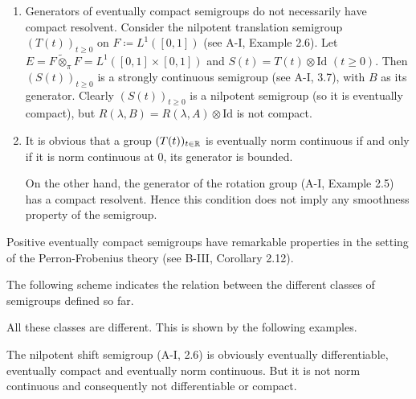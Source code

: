 \begin{remark}\label{rem:a2-1.26}  
	 
\begin{enumerate}[\upshape (i), wide, labelindent=.5em]
\item \label{rem:a2-1.26.1}
Generators of eventually compact semigroups do not necessarily have compact resolvent.
Consider the nilpotent translation semigroup $(T(t))_{t\geq 0}$ on $F \coloneqq L^{1}([0,1])$ (see A-I, Example 2.6).
Let $E = F \widetilde{\otimes}_{\pi} F = L^{1}([0,1] \times [0,1])$ and $S(t) = T(t) \otimes \text{Id}$ $(t \geq 0)$.
Then $(S(t))_{t\geq 0}$ is a strongly continuous semigroup (see A-I, 3.7), 
with $B$ as its generator.
Clearly $(S(t))_{t\geq 0}$ is a nilpotent semigroup (so it is eventually compact), but $R(\lambda,B) = R(\lambda,A) \otimes \text{Id}$ is not compact.

\item \label{rem:a2-1.26.2}
It is obvious that a group $(T(t))_{t \in \mathbb{R}}$ is eventually norm continuous if and only if it is norm continuous at $0$, \ie its generator is bounded.

On the other hand, the generator of the rotation group (A-I, Example 2.5) 
has a compact resolvent.
Hence this condition does not imply any smoothness property of the semigroup.
\end{enumerate}
\end{remark}

Positive eventually compact semigroups have remarkable properties in the setting of the Perron-Frobenius theory (see \eg B-III, Corollary 2.12).

The following scheme indicates the relation between the different classes of semigroups defined so far.


All these classes are different.
This is shown by the following examples.
\begin{example}\label{ex:a2-1.27}
The nilpotent shift semigroup (A-I, 2.6) is obviously eventually differentiable, eventually compact and eventually norm continuous.
But it is not norm continuous and consequently not differentiable or compact.
\end{example}

